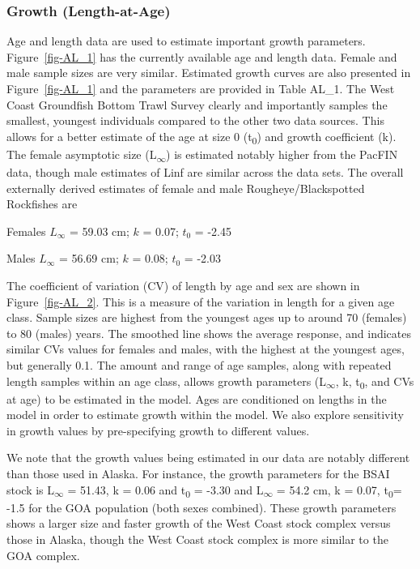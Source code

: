 \documentclass[
]{scrartcl}
\begin{document}
\subsubsection{Growth (Length-at-Age)}\label{growth-length-at-age}

Age and length data are used to estimate important growth parameters.
Figure~\ref{fig-AL_1} has the currently available age and length data.
Female and male sample sizes are very similar. Estimated growth curves
are also presented in Figure~\ref{fig-AL_1} and the parameters are
provided in Table AL\_1. The West Coast Groundfish Bottom Trawl Survey
clearly and importantly samples the smallest, youngest individuals
compared to the other two data sources. This allows for a better
estimate of the age at size 0 (t\textsubscript{0}) and growth
coefficient (k). The female asymptotic size
(L\textsubscript{\(\infty\)}) is estimated notably higher from the
PacFIN data, though male estimates of Linf are similar across the data
sets. The overall externally derived estimates of female and male
Rougheye/Blackspotted Rockfishes are

\begin{centering}

Females $L_{\infty}$ = 59.03 cm; $k$ = 0.07; $t_0$ = -2.45

Males $L_{\infty}$ = 56.69 cm; $k$ = 0.08; $t_0$ = -2.03

\end{centering}

The coefficient of variation (CV) of length by age and sex are shown in
Figure~\ref{fig-AL_2}. This is a measure of the variation in length for
a given age class. Sample sizes are highest from the youngest ages up to
around 70 (females) to 80 (males) years. The smoothed line shows the
average response, and indicates similar CVs values for females and
males, with the highest at the youngest ages, but generally 0.1. The
amount and range of age samples, along with repeated length samples
within an age class, allows growth parameters
(L\textsubscript{\(\infty\)}, k, t\textsubscript{0}, and CVs at age) to
be estimated in the model. Ages are conditioned on lengths in the model
in order to estimate growth within the model. We also explore
sensitivity in growth values by pre-specifying growth to different
values.

We note that the growth values being estimated in our data are notably
different than those used in Alaska. For instance, the growth parameters
for the BSAI stock is L\textsubscript{\(\infty\)} = 51.43, k = 0.06 and
t\textsubscript{0} = -3.30 and L\textsubscript{\(\infty\)} = 54.2 cm, k
= 0.07, t\textsubscript{0}= -1.5 for the GOA population (both sexes
combined). These growth parameters shows a larger size and faster growth
of the West Coast stock complex versus those in Alaska, though the West
Coast stock complex is more similar to the GOA complex.
\end{document}
